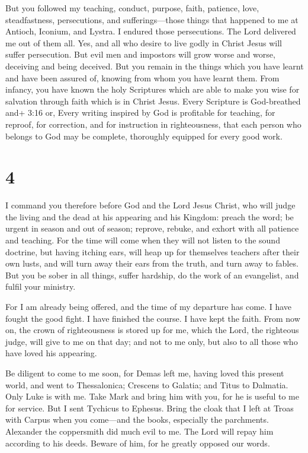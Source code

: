  But you followed my teaching, conduct, purpose, faith,
patience, love, steadfastness,  persecutions, and
sufferings---those things that happened to me at Antioch, Iconium, and
Lystra. I endured those persecutions. The Lord delivered me out of them
all.  Yes, and all who desire to live godly in Christ Jesus
will suffer persecution.  But evil men and impostors will
grow worse and worse, deceiving and being deceived.  But
you remain in the things which you have learnt and have been assured of,
knowing from whom you have learnt them.  From infancy, you
have known the holy Scriptures which are able to make you wise for
salvation through faith which is in Christ Jesus.  Every
Scripture is God-breathed and+ 3:16 or, Every writing inspired by God is
profitable for teaching, for reproof, for correction, and for
instruction in righteousness,  that each person who belongs
to God may be complete, thoroughly equipped for every good work.

\hypertarget{section-3}{%
\section{4}\label{section-3}}

 I command you therefore before God and the Lord Jesus
Christ, who will judge the living and the dead at his appearing and his
Kingdom:  preach the word; be urgent in season and out of
season; reprove, rebuke, and exhort with all patience and teaching.
 For the time will come when they will not listen to the
sound doctrine, but having itching ears, will heap up for themselves
teachers after their own lusts,  and will turn away their
ears from the truth, and turn away to fables.  But you be
sober in all things, suffer hardship, do the work of an evangelist, and
fulfil your ministry.

 For I am already being offered, and the time of my
departure has come.  I have fought the good fight. I have
finished the course. I have kept the faith.  From now on,
the crown of righteousness is stored up for me, which the Lord, the
righteous judge, will give to me on that day; and not to me only, but
also to all those who have loved his appearing.

 Be diligent to come to me soon,  for Demas
left me, having loved this present world, and went to Thessalonica;
Crescens to Galatia; and Titus to Dalmatia.  Only Luke is
with me. Take Mark and bring him with you, for he is useful to me for
service.  But I sent Tychicus to Ephesus. 
Bring the cloak that I left at Troas with Carpus when you come---and the
books, especially the parchments.  Alexander the
coppersmith did much evil to me. The Lord will repay him according to
his deeds.  Beware of him, for he greatly opposed our
words.

